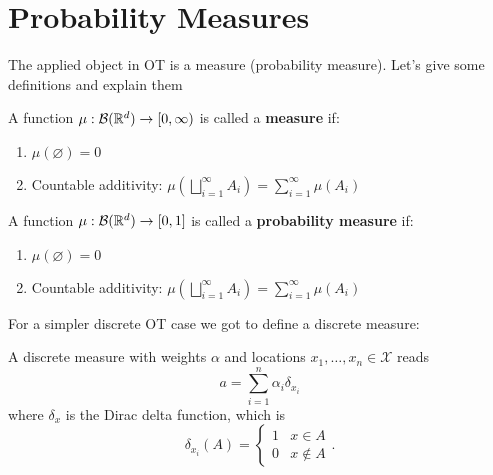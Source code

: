 \section{Probability Measures}

The applied object in OT is a measure (probability measure).
Let's give some definitions and explain them

\begin{definition}[Measure]
  A function $\mu : \mathcal{B}(\mathbb{R}^{d}) \to  [0, \infty)$ is called a
  \textbf{measure} if:
  \begin{enumerate}
    \item $\mu (\varnothing) = 0$
    \item Countable additivity: $\mu \left( \bigsqcup_{i=1}^{\infty} A_i \right) = \sum_{i=1}^{\infty} \mu(A_i) $
  \end{enumerate}
\end{definition}

\begin{definition}
  A function $\mu : \mathcal{B}(\mathbb{R}^{d}) \to  [0, 1]$ is called a
  \textbf{probability measure} if:
  \begin{enumerate}
    \item $\mu (\varnothing) = 0$
    \item Countable additivity: $\mu \left( \bigsqcup_{i=1}^{\infty} A_i \right) = \sum_{i=1}^{\infty} \mu(A_i) $
  \end{enumerate}
\end{definition}



For a simpler discrete OT case we got to define a discrete measure:

\begin{definition}
A discrete measure with weights $\alpha$ and locations $x_{1}, \dots, x_{n} \in \mathcal{X}$ reads
$$
a = \sum_{i=1}^{n} \alpha_{i} \delta_{x_{i}}
$$
where $\delta_{x}$ is the Dirac delta function, which is
\[ \delta_{x_i} (A) = \begin{cases}
  1 & x \in A \\
  0 & x \not\in A
\end{cases}. \]
\end{definition}

